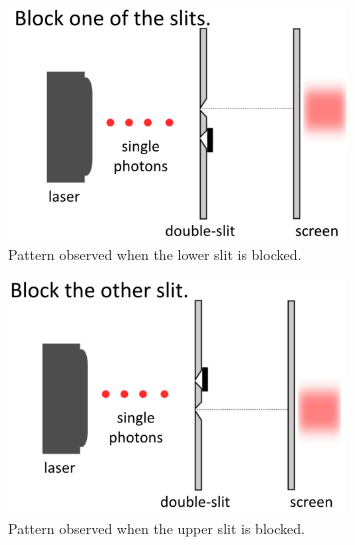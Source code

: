 \begin{figure}[H]
   \centering
    \includegraphics[width=0.8\textwidth]{lesson6/block_bottom.pdf}
    
        \caption{Pattern observed when the lower slit is blocked.}
    \label{fig:two-slit-lower-blocked}
    
\end{figure}

\begin{figure}[H]
   \centering
    \includegraphics[width=0.8\textwidth]{lesson6/block_top.pdf}
    
        \caption{Pattern observed when the upper slit is blocked.}
    \label{fig:two-slit-upper-blocked}
    
\end{figure}


